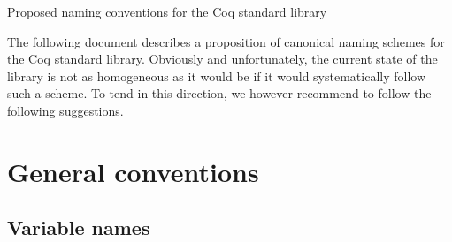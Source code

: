 \documentclass[a4paper]{article}
\begin{document}
\begin{center}
\begin{huge}
Proposed naming conventions for the Coq standard library
\end{huge}
\end{center}
\bigskip

The following document describes a proposition of canonical naming
schemes for the Coq standard library. Obviously and unfortunately, the
current state of the library is not as homogeneous as it would be if
it would systematically follow such a scheme. To tend in this
direction, we however recommend to follow the following suggestions.

\tableofcontents

\section{General conventions}

\subsection{Variable names}
\end{document}
